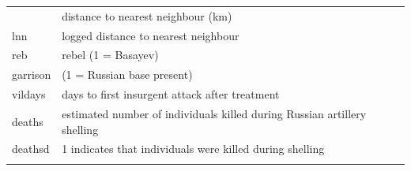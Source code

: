 \documentclass[]{article}
\theoremstyle{definition}
\theoremstyle{definition}
\theoremstyle{definition}
\theoremstyle{remark}
\begin{document}
\begin{longtable}[]{@{}ll@{}}
\begin{minipage}[t]{0.12\columnwidth}
\end{minipage} & \begin{minipage}[t]{0.50\columnwidth}\raggedright\strut
distance to nearest neighbour (km)\strut
\end{minipage}\tabularnewline
\begin{minipage}[t]{0.12\columnwidth}\raggedright\strut
lnn\strut
\end{minipage} & \begin{minipage}[t]{0.50\columnwidth}\raggedright\strut
logged distance to nearest neighbour\strut
\end{minipage}\tabularnewline
\begin{minipage}[t]{0.12\columnwidth}\raggedright\strut
reb\strut
\end{minipage} & \begin{minipage}[t]{0.50\columnwidth}\raggedright\strut
rebel (1 = Basayev)\strut
\end{minipage}\tabularnewline
\begin{minipage}[t]{0.12\columnwidth}\raggedright\strut
garrison\strut
\end{minipage} & \begin{minipage}[t]{0.50\columnwidth}\raggedright\strut
(1 = Russian base present)\strut
\end{minipage}\tabularnewline
\begin{minipage}[t]{0.12\columnwidth}\raggedright\strut
vildays\strut
\end{minipage} & \begin{minipage}[t]{0.50\columnwidth}\raggedright\strut
days to first insurgent attack after treatment\strut
\end{minipage}\tabularnewline
\begin{minipage}[t]{0.12\columnwidth}\raggedright\strut
deaths\strut
\end{minipage} & \begin{minipage}[t]{0.50\columnwidth}\raggedright\strut
estimated number of individuals killed during Russian artillery
shelling\strut
\end{minipage}\tabularnewline
\begin{minipage}[t]{0.12\columnwidth}\raggedright\strut
deathsd\strut
\end{minipage} & \begin{minipage}[t]{0.50\columnwidth}\raggedright\strut
1 indicates that individuals were killed during shelling\strut
\end{minipage}\tabularnewline
\begin{minipage}[t]{0.12\columnwidth}\raggedright\strut

\end{minipage}
\end{longtable}
\end{document}
